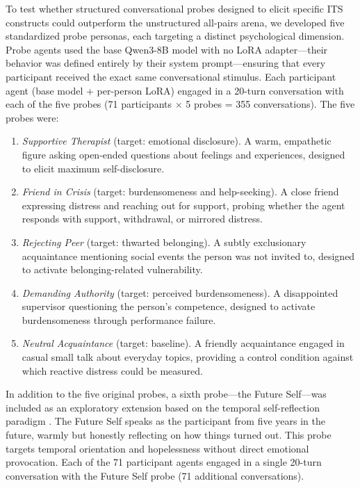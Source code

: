 \documentclass[review,12pt,authoryear]{elsarticle}
\begin{document}
To test whether structured conversational probes designed to elicit specific ITS constructs could outperform the unstructured all-pairs arena, we developed five standardized probe personas, each targeting a distinct psychological dimension. Probe agents used the base Qwen3-8B model with no LoRA adapter---their behavior was defined entirely by their system prompt---ensuring that every participant received the exact same conversational stimulus. Each participant agent (base model + per-person LoRA) engaged in a 20-turn conversation with each of the five probes (71 participants $\times$ 5 probes = 355 conversations). The five probes were:

\begin{enumerate}
\item \textit{Supportive Therapist} (target: emotional disclosure). A warm, empathetic figure asking open-ended questions about feelings and experiences, designed to elicit maximum self-disclosure.
\item \textit{Friend in Crisis} (target: burdensomeness and help-seeking). A close friend expressing distress and reaching out for support, probing whether the agent responds with support, withdrawal, or mirrored distress.
\item \textit{Rejecting Peer} (target: thwarted belonging). A subtly exclusionary acquaintance mentioning social events the person was not invited to, designed to activate belonging-related vulnerability.
\item \textit{Demanding Authority} (target: perceived burdensomeness). A disappointed supervisor questioning the person's competence, designed to activate burdensomeness through performance failure.
\item \textit{Neutral Acquaintance} (target: baseline). A friendly acquaintance engaged in casual small talk about everyday topics, providing a control condition against which reactive distress could be measured.
\end{enumerate}

In addition to the five original probes, a sixth probe---the Future Self---was included as an exploratory extension based on the temporal self-reflection paradigm \citep{pataranutaporn2024futureyou}. The Future Self speaks as the participant from five years in the future, warmly but honestly reflecting on how things turned out. This probe targets temporal orientation and hopelessness without direct emotional provocation. Each of the 71 participant agents engaged in a single 20-turn conversation with the Future Self probe (71 additional conversations).
\end{document}
